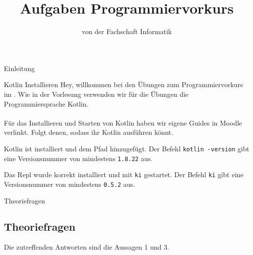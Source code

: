 
\title{Aufgaben Programmiervorkurs}
\subtitle{von der Fachschaft Informatik\hfill\ptitle}

\usepackage{hyperref}
\usepackage{wrapfig}


\maketitle{}

\begin{task}[points=auto]{Einleitung}
    \begin{subtask*}[points=0]{Kotlin Installieren}
        Hey, willkommen bei den Übungen zum Programmiervorkurs im \ptitle. Wie in der
        Vorlesung verwenden wir für die Übungen die Programmiersprache Kotlin. \\\\
        Für das Installieren und Starten von Kotlin haben wir eigene Guides in Moodle verlinkt.
        Folgt denen, sodass ihr Kotlin ausführen könnt.
        \begin{solution}
            Kotlin ist installiert und dem Pfad hinzugefügt. Der Befehl
            \texttt{kotlin -version} gibt eine Versionsnummer von mindestens \texttt{1.8.22} aus.

            Das Repl wurde korrekt installiert und mit \texttt{ki} gestartet. Der Befehl
            \texttt{ki} gibt eine Versionsnummer von mindestens \texttt{0.5.2} aus.
        \end{solution}
    \end{subtask*}
    \begin{subtask*}[points=0]{Theoriefragen}
        \subsection{Theoriefragen}
        \begin{itemize}
            \mchead
        \end{itemize}
        \begin{solution}
            Die zutreffenden Antworten sind die Aussagen 1 und 3.
        \end{solution}
    \end{subtask*}
\end{task}

